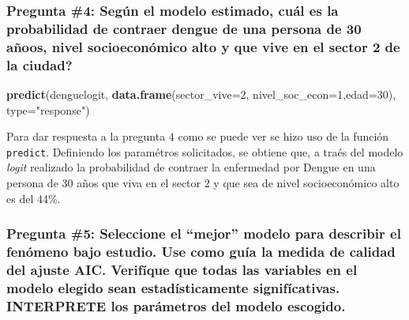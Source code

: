 \documentclass[
]{article}
\newenvironment{Shaded}{\begin{snugshade}}{\end{snugshade}}
\newcommand{\DataTypeTok}[1]{\textcolor[rgb]{0.13,0.29,0.53}{#1}}
\newcommand{\DecValTok}[1]{\textcolor[rgb]{0.00,0.00,0.81}{#1}}
\newcommand{\KeywordTok}[1]{\textcolor[rgb]{0.13,0.29,0.53}{\textbf{#1}}}
\newcommand{\NormalTok}[1]{#1}
\newcommand{\StringTok}[1]{\textcolor[rgb]{0.31,0.60,0.02}{#1}}
\begin{document}
\hypertarget{pregunta-4-seguxfan-el-modelo-estimado-cuuxe1l-es-la-probabilidad-de-contraer-dengue-de-una-persona-de-30-auxf1oos-nivel-socioeconuxf3mico-alto-y-que-vive-en-el-sector-2-de-la-ciudad}{%
\subsubsection{Pregunta \#4: Según el modelo estimado, cuál es la
probabilidad de contraer dengue de una persona de 30 añoos, nivel
socioeconómico alto y que vive en el sector 2 de la
ciudad?}\label{pregunta-4-seguxfan-el-modelo-estimado-cuuxe1l-es-la-probabilidad-de-contraer-dengue-de-una-persona-de-30-auxf1oos-nivel-socioeconuxf3mico-alto-y-que-vive-en-el-sector-2-de-la-ciudad}}

\begin{Shaded}
\begin{Highlighting}[]
\KeywordTok{predict}\NormalTok{(denguelogit, }\KeywordTok{data.frame}\NormalTok{(}\DataTypeTok{sector_vive=}\DecValTok{2}\NormalTok{, }\DataTypeTok{nivel_soc_econ=}\DecValTok{1}\NormalTok{,}\DataTypeTok{edad=}\DecValTok{30}\NormalTok{), }\DataTypeTok{type=}\StringTok{"response"}\NormalTok{)}
\end{Highlighting}
\end{Shaded}

Para dar respuesta a la pregunta 4 como se puede ver se hizo uso de la
función \texttt{predict}. Definiendo los paramétros solicitados, se
obtiene que, a traés del modelo \emph{logit} realizado la probabilidad
de contraer la enfermedad por Dengue en una persona de 30 años que viva
en el sector 2 y que sea de nivel socioeconómico alto es del 44\%.

\hypertarget{pregunta-5-seleccione-el-mejor-modelo-para-describir-el-fenuxf3meno-bajo-estudio.-use-como-guuxeda-la-medida-de-calidad-del-ajuste-aic.-verifuxedque-que-todas-las-variables-en-el-modelo-elegido-sean-estaduxedsticamente-signifuxedcativas.-interprete-los-paruxe1metros-del-modelo-escogido.}{%
\subsubsection{Pregunta \#5: Seleccione el ``mejor'' modelo para
describir el fenómeno bajo estudio. Use como guía la medida de calidad
del ajuste AIC. Verifíque que todas las variables en el modelo elegido
sean estadísticamente signifícativas. INTERPRETE los parámetros del
modelo
escogido.}\label{pregunta-5-seleccione-el-mejor-modelo-para-describir-el-fenuxf3meno-bajo-estudio.-use-como-guuxeda-la-medida-de-calidad-del-ajuste-aic.-verifuxedque-que-todas-las-variables-en-el-modelo-elegido-sean-estaduxedsticamente-signifuxedcativas.-interprete-los-paruxe1metros-del-modelo-escogido.}}
\end{document}

